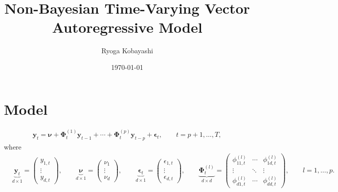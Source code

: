 \documentclass[fleqn]{article}
\title{Non-Bayesian Time-Varying Vector Autoregressive Model}
\date{\today}
\author{Ryoga Kobayashi}
\begin{document}
\maketitle

\section{Model}

\begin{align*}
    \bm y_t = \bm \nu + \bm \Phi^{(1)}_{t} \bm y_{t-1} + \cdots + \bm \Phi^{(p)}_{t} \bm y_{t-p} + \bm \epsilon_t, \qquad t = p+1, \dots, T,
\end{align*}
where
\begin{align*}
    & \underbrace{\bm y_t}_{d \times 1} = \begin{pmatrix}
        y_{1, t} \\
        \vdots \\
        y_{d, t}
    \end{pmatrix},
    \qquad
    \underbrace{\bm \nu}_{d \times 1} = \begin{pmatrix}
        \nu_1 \\
        \vdots \\
        \nu_d
    \end{pmatrix},
    \qquad
    \underbrace{\bm \epsilon_t}_{d \times 1} = \begin{pmatrix}
        \epsilon_{1, t} \\
        \vdots \\
        \epsilon_{d, t}
    \end{pmatrix},
    \qquad
    \underbrace{\bm \Phi^{(l)}_t}_{d \times d} = \begin{pmatrix}
        \phi^{(l)}_{11, t} & \cdots & \phi^{(l)}_{1d, t} \\
        \vdots & \ddots & \vdots \\
        \phi^{(l)}_{d1, t} & \cdots & \phi^{(l)}_{dd, t}
    \end{pmatrix},
    \qquad
    l = 1, \dots, p.
\end{align*}
\end{document}
